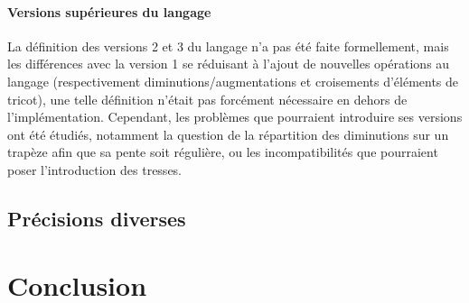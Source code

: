 \documentclass{article}
\begin{document}
\paragraph{Versions supérieures du langage}

La définition des versions 2 et 3 du langage n'a pas été faite formellement, mais les différences avec la version 1 se réduisant à l'ajout de 
nouvelles opérations au langage (respectivement diminutions/augmentations et croisements d'éléments de tricot), une telle définition n'était pas 
forcément nécessaire en dehors de l'implémentation. 
Cependant, les problèmes que pourraient introduire ses versions ont été étudiés, notamment la question de la répartition des diminutions sur un 
trapèze afin que sa pente soit régulière, ou les incompatibilités que pourraient poser l'introduction des tresses.


\subsection{Précisions diverses}

\section*{Conclusion}
\end{document}

